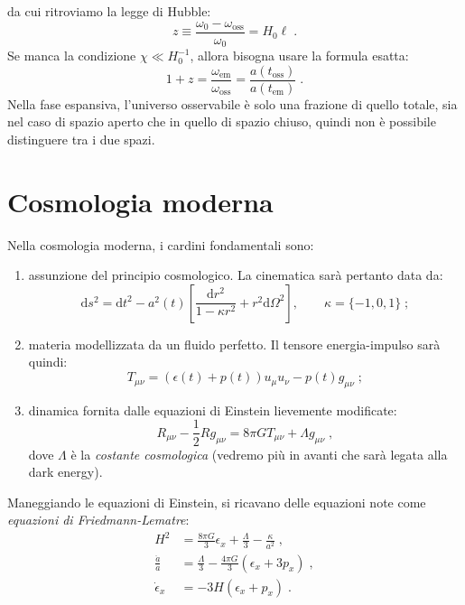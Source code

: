 \documentclass[12pt,a4paper]{report}
\theoremstyle{definition}
\newcommand{\diff}[1][]{\mathrm{d}#1}
\begin{document}
da cui ritroviamo la legge di Hubble:
\begin{equation}
z\equiv \frac{\omega_0-\omega_{\mathrm{oss}}}{\omega_0}=H_0\ell\;.
\end{equation}
Se manca la condizione $\chi\ll H_0^{-1}$, allora bisogna usare la formula esatta:
\begin{equation}
1+z=\frac{\omega_{\mathrm{em}}}{\omega_{\mathrm{oss}}}=\frac{a(t_{\mathrm{oss}})}{a(t_{\mathrm{em}})}\;.
\end{equation}
Nella fase espansiva, l'universo osservabile è solo una frazione di quello totale, sia nel caso di spazio aperto che in quello di spazio chiuso, quindi non è possibile distinguere tra i due spazi.
\section{Cosmologia moderna}
Nella cosmologia moderna, i cardini fondamentali sono:
\begin{enumerate}
\item assunzione del principio cosmologico. La cinematica sarà pertanto data da:
\begin{equation}
\diff{s}^2=\diff{t}^2-a^2(t)\left[\frac{\diff{r}^2}{1-\kappa r^2}+r^2\diff{\Omega}^2\right],\qquad \kappa=\{-1,0,1\}\;;
\end{equation}
\item materia modellizzata da un fluido perfetto. Il tensore energia-impulso sarà quindi:
\begin{equation}
T_{\mu\nu}=(\epsilon(t)+p(t))u_{\mu}u_{\nu}-p(t)g_{\mu\nu}\;;
\end{equation}
\item dinamica fornita dalle equazioni di Einstein lievemente modificate:
\begin{equation}
R_{\mu\nu}-\frac{1}{2}Rg_{\mu\nu}=8\pi GT_{\mu\nu}+\Lambda g_{\mu\nu}\;,
\end{equation}
dove $\Lambda$ è la \emph{costante cosmologica} (vedremo più in avanti che sarà legata alla dark energy).
\end{enumerate}
Maneggiando le equazioni di Einstein, si ricavano delle equazioni note come \emph{equazioni di Friedmann-Lematre}:
\begin{align}
H^2 &= \frac{8\pi G}{3}\epsilon_x+\frac{\Lambda}{3}-\frac{\kappa}{a^2}\;, \label{ch6_fried1} \\
\frac{\ddot{a}}{a}&=\frac{\Lambda}{3}-\frac{4\pi G}{3}(\epsilon_x+3p_x)\;, \label{ch6_fried2}\\
\dot{\epsilon}_x &= -3H(\epsilon_x+p_x)\;. \label{ch6_continuity}
\end{align}
\end{document}
